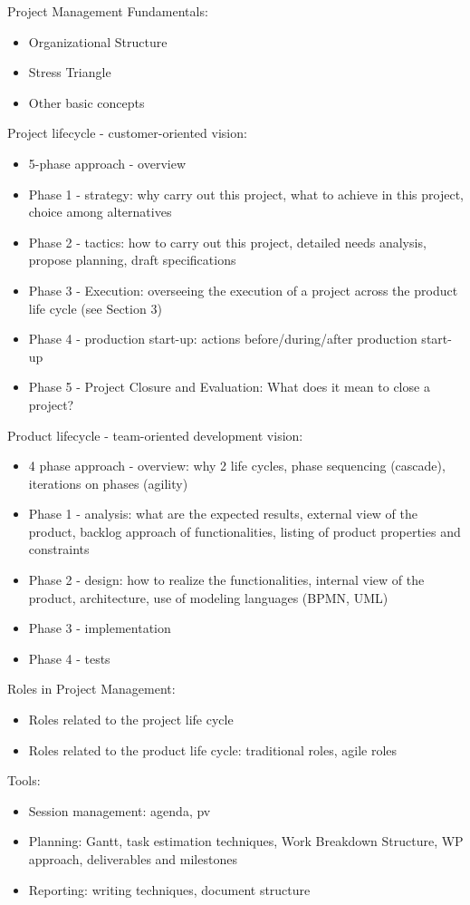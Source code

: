 Project Management Fundamentals:
\begin{itemize}
    \item Organizational Structure
    \item Stress Triangle
    \item Other basic concepts
\end{itemize}
Project lifecycle - customer-oriented vision:
\begin{itemize}
    \item 5-phase approach - overview
    \item Phase 1 - strategy: why carry out this project, what to achieve in this project, choice among alternatives
    \item Phase 2 - tactics: how to carry out this project, detailed needs analysis, propose planning, draft specifications
    \item Phase 3 - Execution: overseeing the execution of a project across the product life cycle (see Section 3)
    \item Phase 4 - production start-up: actions before/during/after production start-up
    \item Phase 5 - Project Closure and Evaluation: What does it mean to close a project?
\end{itemize}
\pagebreak
Product lifecycle - team-oriented development vision:
\begin{itemize}
    \item 4 phase approach - overview: why 2 life cycles, phase sequencing (cascade), iterations on phases (agility)
    \item Phase 1 - analysis: what are the expected results, external view of the product, backlog approach of functionalities, listing of product properties and constraints
    \item Phase 2 - design: how to realize the functionalities, internal view of the product, architecture, use of modeling languages (BPMN, UML)
    \item Phase 3 - implementation
    \item Phase 4 - tests
\end{itemize}
Roles in Project Management:
\begin{itemize}
    \item Roles related to the project life cycle
    \item Roles related to the product life cycle: traditional roles, agile roles
\end{itemize}
Tools:
\begin{itemize}
    \item Session management: agenda, pv
    \item Planning: Gantt, task estimation techniques, Work Breakdown Structure, WP approach, deliverables and milestones
    \item Reporting: writing techniques, document structure
\end{itemize}